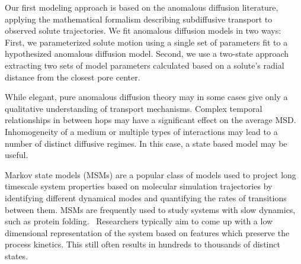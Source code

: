 \documentclass{article}
\begin{document}
  Our first modeling approach is based on the anomalous diffusion literature, 
  applying the mathematical formalism describing subdiffusive transport to observed
  solute trajectories. We fit anomalous diffusion models in two ways: 
  First, we parameterized solute motion using a single set of parameters fit
  to a hypothesized anomalous diffusion model. Second, we use a two-state approach
  extracting two sets of model parameters calculated based on a solute's radial
  distance from the closest pore center.
  
  While elegant, pure anomalous diffusion theory may in some cases give only a 
  qualitative understanding of transport mechanisms. 
  Complex temporal relationships in 
  between hops may have a significant effect on the average MSD. Inhomogeneity of 
  a medium or multiple types of interactions may lead to a number of distinct 
  diffusive regimes. In this case, a state based model may be useful. 
  

  Markov state models (MSMs) are a popular class of models used to project long timescale
  system properties based on molecular simulation trajectories by identifying
  different dynamical modes and quantifying the rates of transitions between them.
  MSMs are frequently used to study systems with slow dynamics, such as protein 
  folding.~\cite{snow_how_2005,chodera_automatic_2007} Researchers typically aim to 
  come up with a low dimensional representation of the system based on features 
  which preserve the process kinetics. This still often results in hundreds to thousands
  of distinct states.~\cite{chodera_markov_2014}
\end{document}
